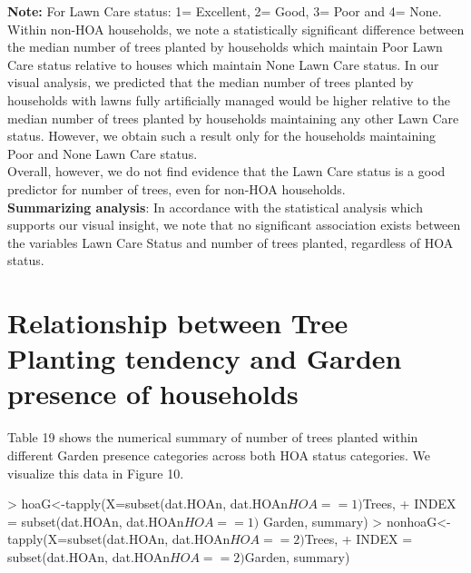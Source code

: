 \documentclass{article}
\begin{document}
\textbf{Note:} For Lawn Care status: 1= Excellent, 2= Good, 3= Poor and 4= None.\\

Within non-HOA households, we note a statistically significant difference between the median number of trees planted by households which maintain Poor Lawn Care status relative to houses which maintain None Lawn Care status. In our visual analysis, we predicted that the median number of trees planted by households with lawns fully artificially managed would be higher relative to the median number of trees planted by households maintaining any other Lawn Care status. However, we obtain such a result only for the households maintaining Poor and None Lawn Care status.\\

Overall, however, we do not find evidence that the Lawn Care status is a good predictor for number of trees, even for non-HOA households. \\

\textbf{Summarizing analysis}: In accordance with the statistical analysis which supports our visual insight, we note that no significant association exists between the variables Lawn Care Status and number of trees planted, regardless of HOA status.

\section*{Relationship between Tree Planting tendency and Garden presence of households}

Table 19 shows the numerical summary of number of trees planted within different Garden presence categories across both HOA status categories. We visualize this data in Figure 10.

\begin{Schunk}
\begin{Sinput}
> hoaG<-tapply(X=subset(dat.HOAn, dat.HOAn$HOA==1)$Trees,
+     INDEX = subset(dat.HOAn, dat.HOAn$HOA==1)$ Garden, summary)
> nonhoaG<- tapply(X=subset(dat.HOAn, dat.HOAn$HOA==2)$Trees,
+     INDEX = subset(dat.HOAn, dat.HOAn$HOA==2)$Garden, summary)
\end{Sinput}
\end{Schunk}
\end{document}
